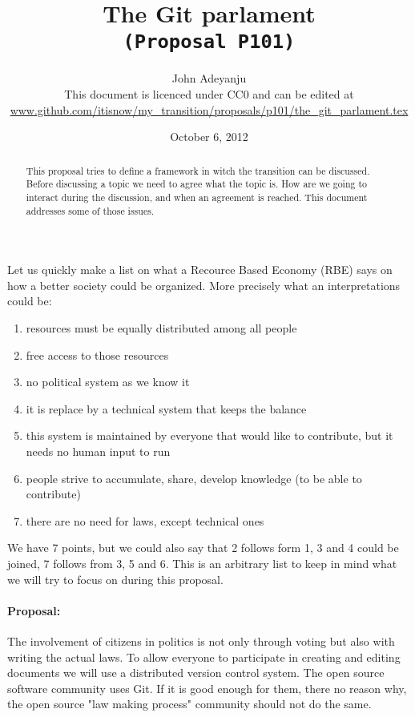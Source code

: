 \documentclass{article}
\begin{document}
\title{The Git parlament\\\tt{\small{(Proposal P101)}}\\\tt{\small{}}}%
\author{John Adeyanju\\\small{This document is licenced under CC0 and can be edited at}\\ \footnotesize{\url{www.github.com/itisnow/my_transition/proposals/p101/the_git_parlament.tex}}}
\date{October 6, 2012}

\maketitle

\begin{abstract}
This proposal tries to define a framework in witch the transition can be discussed.
Before discussing a topic we need to agree what the topic is.
How are we going to interact during the discussion, and when an agreement is reached.
This document addresses some of those issues.
\end{abstract}

Let us quickly make a list on what a Recource Based Economy (RBE)\cite{rbe} says on how a better society could be organized.
More precisely what an interpretations could be:
\begin{enumerate}
\item resources must be equally distributed among all people
\item free access to those resources
\item no political system as we know it
\item it is replace by a technical system that keeps the balance
\item this system is maintained by everyone that would like to contribute, but it needs no human input to run
\item people strive to accumulate, share, develop knowledge (to be able to contribute)
\item there are no need for laws, except technical ones
\end{enumerate}
We have 7 points, but we could also say that 2 follows form 1, 3 and 4 could be joined, 7 follows from 3, 5 and 6.
This is an arbitrary list to keep in mind what we will try to focus on during this proposal.

\paragraph{Proposal:}
The involvement of citizens in politics is not only through voting but also with writing the actual laws.
To allow everyone to participate in creating and editing documents we will use a distributed version control system.
The open source software community uses Git.
If it is good enough for them, there no reason why, the open source "law making process" community should not do the same.
\end{document}
